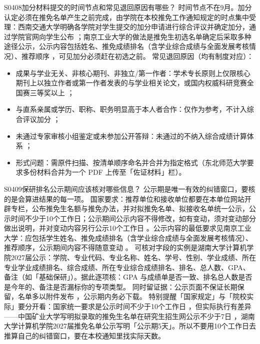 \begin{qa}{S0408}{加分材料提交的时间节点和常见退回原因有哪些？}
时间节点不在9月。加分认定必须在推免名单产生之前完成，由学院在本校推免工作通知规定的时点集中受理：西南交通大学明确各学院对学生提交的加分申请进行综合评议并确定加分，通过学院官网向学生公布 ；南京工业大学的做法是推免生初选名单确定后采取多种途径公示，公示内容包括姓名、推免成绩排名（含学业综合成绩与全面发展考核情况）、推荐顺序 ，可见加分必须赶在初选之前。
常见退回原因（均有制度对应）：
\begin{itemize}
  \item 成果与学业无关、非核心期刊、非独立/第一作者：学术专长原则上仅限核心期刊上以独立作者或第一作者发表的与学业相关论文，或国内权威科研竞赛全国赛三等奖以上 ；
  \item 与直系亲属或学历、职称、职务明显高于本人者合作：仅作为参考，不计入综合评议加分 ；
  \item 未通过专家审核小组鉴定或未参加公开答辩：未通过的不纳入综合成绩计算体系 ；
  \item 形式问题：需原件扫描、按清单顺序命名并合并为指定格式（东北师范大学要求多份材料合并为一个 PDF 上传至「佐证材料」栏）。
\end{itemize}
\end{qa}

\begin{qa}{S0409}{保研排名公示期间应该核对哪些信息？}
公示期是唯一有效的纠错窗口，要核的是会算进结果的每一项。
国家要求：推荐单位和接收单位都要在本单位网站开辟专栏，公布推免生名额与推免办法，并对拟推免名单、拟接收名单统一公示，公示时间不少于10个工作日；公示期间公示内容不得修改，如有变动，须对变动部分做出说明，并对变动内容另行公示10个工作日 。公示内容的最低要求见南京工业大学：应包括学生姓名、推免成绩排名（含学业综合成绩与全面发展考核情况）、推荐顺序，公示期间内容不得随意变动 。
可核对字段的实例是湖南大学计算机学院2027届公示：学院、专业代码、专业名称、姓名、学号、性别、学业成绩、所在专业学业成绩排名、综合成绩、所在专业综合成绩排名、排名、总人数、GPA、备注（如「基础保研」）。据此逐项核：GPA 与成绩单是否一致、排名总人数是否是今年的、备注是否漏标你的专项类型。
同时留证据：公示页面不保证长期保留，名单多以附件发布 ，公示期内务必下载。
特别提醒「国家规定」与「院校实际」要分开看：国家统一要求是公示时间不少于10个工作日 ，但实际执行有差异——中国矿业大学写明拟录取的推免生名单在研究生招生网公示不少于7日 ，湖南大学计算机学院2027届推免名单公示写明「公示期5天」。所以不要用10个工作日去推算自己的纠错窗口，要在本校通知里找实际天数。
\end{qa}


